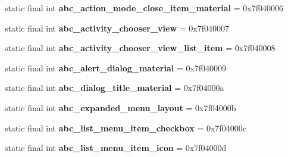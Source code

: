\begin{DoxyCompactItemize}
\item 
\hypertarget{classandroid_1_1support_1_1design_1_1_r_1_1layout_acf611bbfd39d0104f58774f7799a59c0}{}static final int {\bfseries abc\+\_\+action\+\_\+mode\+\_\+close\+\_\+item\+\_\+material} = 0x7f040006\label{classandroid_1_1support_1_1design_1_1_r_1_1layout_acf611bbfd39d0104f58774f7799a59c0}

\item 
\hypertarget{classandroid_1_1support_1_1design_1_1_r_1_1layout_a43a54b73c3cfb776e7a50094cc91b8c1}{}static final int {\bfseries abc\+\_\+activity\+\_\+chooser\+\_\+view} = 0x7f040007\label{classandroid_1_1support_1_1design_1_1_r_1_1layout_a43a54b73c3cfb776e7a50094cc91b8c1}

\item 
\hypertarget{classandroid_1_1support_1_1design_1_1_r_1_1layout_aadf7a74bdcfcc0214b577ca8912b47d1}{}static final int {\bfseries abc\+\_\+activity\+\_\+chooser\+\_\+view\+\_\+list\+\_\+item} = 0x7f040008\label{classandroid_1_1support_1_1design_1_1_r_1_1layout_aadf7a74bdcfcc0214b577ca8912b47d1}

\item 
\hypertarget{classandroid_1_1support_1_1design_1_1_r_1_1layout_ae345cc83bdcd7ddfdbf543e4483b9515}{}static final int {\bfseries abc\+\_\+alert\+\_\+dialog\+\_\+material} = 0x7f040009\label{classandroid_1_1support_1_1design_1_1_r_1_1layout_ae345cc83bdcd7ddfdbf543e4483b9515}

\item 
\hypertarget{classandroid_1_1support_1_1design_1_1_r_1_1layout_ab98202b6d43ce7854889d44c825908af}{}static final int {\bfseries abc\+\_\+dialog\+\_\+title\+\_\+material} = 0x7f04000a\label{classandroid_1_1support_1_1design_1_1_r_1_1layout_ab98202b6d43ce7854889d44c825908af}

\item 
\hypertarget{classandroid_1_1support_1_1design_1_1_r_1_1layout_a8dd1e24e585a6ed15385c5fa7a9a543b}{}static final int {\bfseries abc\+\_\+expanded\+\_\+menu\+\_\+layout} = 0x7f04000b\label{classandroid_1_1support_1_1design_1_1_r_1_1layout_a8dd1e24e585a6ed15385c5fa7a9a543b}

\item 
\hypertarget{classandroid_1_1support_1_1design_1_1_r_1_1layout_a2c90f63e9a8c8b2e68269eae863ae97d}{}static final int {\bfseries abc\+\_\+list\+\_\+menu\+\_\+item\+\_\+checkbox} = 0x7f04000c\label{classandroid_1_1support_1_1design_1_1_r_1_1layout_a2c90f63e9a8c8b2e68269eae863ae97d}

\item 
\hypertarget{classandroid_1_1support_1_1design_1_1_r_1_1layout_aaa44eb526bc60350d6aaf3be20618c64}{}static final int {\bfseries abc\+\_\+list\+\_\+menu\+\_\+item\+\_\+icon} = 0x7f04000d\label{classandroid_1_1support_1_1design_1_1_r_1_1layout_aaa44eb526bc60350d6aaf3be20618c64}


\end{DoxyCompactItemize}
